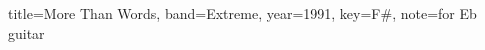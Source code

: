 \documentclass{skrul-leadsheet}
\begin{document}
\begin{song}[transpose-capo=true,transpose=1,enharmonic=sharp]{title={More Than Words}, band={Extreme}, year={1991}, key={F#}, note={for Eb guitar}}

\end{song}
\end{document}
